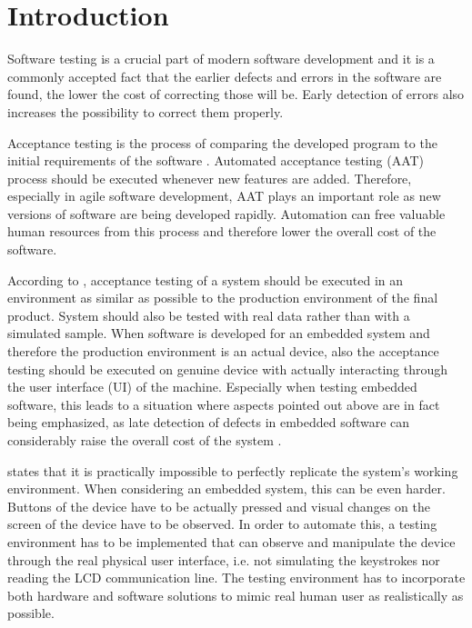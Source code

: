 
\chapter{Introduction}
\label{chapter:intro}

Software testing is a crucial part of modern software development and it is a commonly accepted fact that the earlier defects and errors in the software are found, the lower the cost of correcting those will be. Early detection of errors also increases the possibility to correct them properly. \citep{myers2011art}

Acceptance testing is the process of comparing the developed program to the initial requirements of the software \citep{myers2011art}. Automated acceptance testing (AAT) process should be executed whenever new features are added. Therefore, especially in agile software development, AAT plays an important role as new versions of software are being developed rapidly. Automation can free valuable human resources from this process \citep{haugset2008automated} and therefore lower the overall cost of the software.

According to \cite{sommerville2011software}, acceptance testing of a system should be executed in an environment as similar as possible to the production environment of the final product. System should also be tested with real data rather than with a simulated sample. When software is developed for an embedded system and therefore the production environment is an actual device, also the acceptance testing should be executed on genuine device with actually interacting through the user interface (UI) of the machine. Especially when testing embedded software, this leads to a situation where aspects pointed out above are in fact being emphasized, as late detection of defects in embedded software can considerably raise the overall cost of the system \citep{ebert2009embedded}.

\cite{sommerville2011software} states that it is practically impossible to perfectly replicate the system's working environment. When considering an embedded system, this can be even harder. Buttons of the device have to be actually pressed and visual changes on the screen of the device have to be observed. In order to automate this, a testing environment has to be implemented that can observe and manipulate the device through the real physical user interface, i.e. not simulating the keystrokes nor reading the LCD communication line. The testing environment has to incorporate both hardware and software solutions to mimic real human user as realistically as possible.

